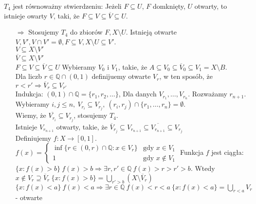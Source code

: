 \begin{dd} 
    $T_4$ jest równoważny stwierdzeniu: Jeżeli $F \subseteq U$, $F$ domknięty, $U$ otwarty, to istnieje 
    owarty $V$, taki, że $ F \subseteq V \subseteq \overline V \subseteq U$. 
    \begin{itemize} 
        \item[$\Rightarrow$] Stosujemy $T_4$ do zbiorów $F, X\setminus U$. Istnieją otwarte $V,V', V \cap V' =
            \emptyset, F \subseteq V, X \setminus U \subseteq V'$. \\
            $V \subseteq X \setminus V'$ \\ 
            $\overline V \subseteq X \setminus V'$ \\ 
            $F \subseteq V \subseteq \overline V \subseteq U$
            Wybieramy $V_0$ i $V_1$, takie, że $A \subseteq V_0 \subseteq \overline V_0 \subseteq 
            V_1 = X \setminus B$. \\ 
            Dla liczb $r \in \mathbb Q \cap (0,1)$ definijuemy otwarte $V_r$, w ten sposób, że 
            $r < r' \Rightarrow \overline V_r \subseteq V_{r'}$ \\ 
            Indukcja: $(0,1) \cap \mathbb Q = \{ r_1,r_2,\ldots \}$, Dla danych $V_{r_1},\ldots,V_{r_n}$. 
            Rozważamy $r_{n+1}$. \\ 
            Wybieramy $i,j \le n, \ V_{r_i} \subseteq V_{r_j},\ (r_i,r_j) \cap \{r_1,\ldots,r_n\} = \emptyset$.\\
            Wiemy, że $\overline{V_{r_i}} \subseteq V_{r_j}$, stosujemy $T_4$. \\ 
            Istnieje $V_{r_{n+1}}$ otwarty, takie, że $\overline V_{r_j} \subseteq V_{r_{n+1}} \subseteq 
            \overline{ V_{r_{n+1}}} \subseteq V_{r_j}$ \\ 
            Definiujemy $f : X \to [0,1]$. $f(x) = \begin{cases} \inf \{r \in (0,r) \cap 
                \mathbb Q : x \in V_r \} &\text{gdy } x \in V_1 \\ 
            1 & \text{gdy } x \notin V_1 \end{cases}$
            Funkcja $f$ jest ciągła: \\ 
            $\{ x : f(x) > b \} \ f(x) > b \Rightarrow \exists r,r' \in \mathbb Q\ f(x) > r > r' > b$. Wtedy 
            $x \notin V_r \supseteq \overline V_r \ \{x : f(x) > b\} = \bigcup\limits_{r' > b} (X \setminus 
            \overline V_r)$\\ 
            $\{x : f(x) < a \} \ f(x) < a \Rightarrow \exists r \in \mathbb Q \ f(x) < r < a \
            \{ x: f(x) < a \} = \bigcup\limits_{r < a} V_r$ - otwarte
    \end{itemize} 
\end{dd} 
